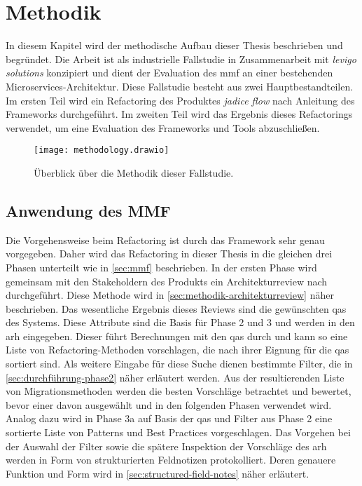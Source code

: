 \chapter{Methodik}
\label{chap:methodik}

In diesem Kapitel wird der methodische Aufbau dieser Thesis beschrieben und begründet.
Die Arbeit ist als industrielle Fallstudie in Zusammenarbeit mit \emph{levigo solutions} konzipiert und dient der Evaluation des \gls{mmf} an einer bestehenden Microservices-Architektur.
Diese Fallstudie besteht aus zwei Hauptbestandteilen.
Im ersten Teil wird ein Refactoring des Produktes \emph{jadice flow} nach Anleitung des Frameworks durchgeführt.
Im zweiten Teil wird das Ergebnis dieses Refactorings verwendet, um eine Evaluation des Frameworks und Tools abzuschließen.

\begin{figure}[!ht]
	\centering
	\texttt{[image: methodology.drawio]}
	\caption[Überblick über die Methodik dieser Fallstudie]{
		Überblick über die Methodik dieser Fallstudie.
	}
	\label{fig:methodology}
\end{figure}

\section{Anwendung des MMF}

Die Vorgehensweise beim Refactoring ist durch das Framework sehr genau vorgegeben.
Daher wird das Refactoring in dieser Thesis in die gleichen drei Phasen unterteilt wie in \cref{sec:mmf} beschrieben.
In der ersten Phase wird gemeinsam mit den Stakeholdern des Produkts ein Architekturreview nach  durchgeführt.
Diese Methode wird in \cref{sec:methodik-architekturreview} näher beschrieben.
Das wesentliche Ergebnis dieses Reviews sind die gewünschten \glspl{qa} des Systems.
Diese Attribute sind die Basis für Phase 2 und 3 und werden in den \gls{arh} eingegeben.
Dieser führt Berechnungen mit den \glspl{qa} durch und kann so eine Liste von Refactoring-Methoden vorschlagen, die nach ihrer Eignung für die \glspl{qa} sortiert sind.
Als weitere Eingabe für diese Suche dienen bestimmte Filter, die in \cref{sec:durchführung-phase2} näher erläutert werden.
Aus der resultierenden Liste von Migrationsmethoden werden die besten Vorschläge betrachtet und bewertet, bevor einer davon ausgewählt und in den folgenden Phasen verwendet wird.
Analog dazu wird in Phase 3a auf Basis der \glspl{qa} und Filter aus Phase 2 eine sortierte Liste von Patterns und Best Practices vorgeschlagen.
Das Vorgehen bei der Auswahl der Filter sowie die spätere Inspektion der Vorschläge des \gls{arh} werden in Form von strukturierten Feldnotizen protokolliert.
Deren genauere Funktion und Form wird in \cref{sec:structured-field-notes} näher erläutert.

